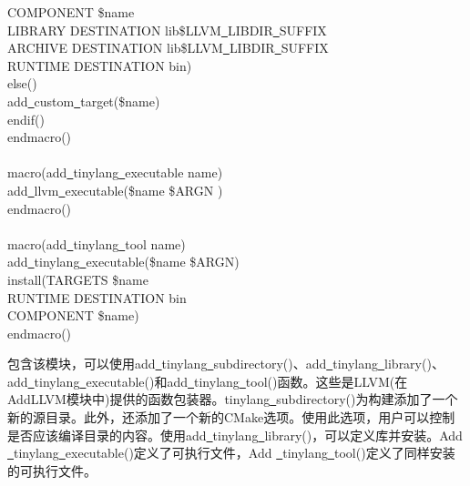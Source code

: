 \begin{tcolorbox}[colback=white,colframe=black]
\hspace*{1.5cm}COMPONENT \${name} \\
\hspace*{1.5cm}LIBRARY DESTINATION lib\${LLVM\underline{~}LIBDIR\underline{~}SUFFIX} \\
\hspace*{1.5cm}ARCHIVE DESTINATION lib\${LLVM\underline{~}LIBDIR\underline{~}SUFFIX} \\
\hspace*{1.5cm}RUNTIME DESTINATION bin) \\
\hspace*{0.5cm}else() \\
\hspace*{1cm}add\underline{~}custom\underline{~}target(\${name}) \\
\hspace*{0.5cm}endif() \\
endmacro() \\
 \\
macro(add\underline{~}tinylang\underline{~}executable name) \\
\hspace*{0.5cm}add\underline{~}llvm\underline{~}executable(\${name} \${ARGN} ) \\
endmacro() \\
 \\
macro(add\underline{~}tinylang\underline{~}tool name) \\
\hspace*{0.5cm}add\underline{~}tinylang\underline{~}executable(\${name} \${ARGN}) \\
\hspace*{0.5cm}install(TARGETS \${name} \\
\hspace*{1cm}RUNTIME DESTINATION bin \\
\hspace*{1cm}COMPONENT \${name}) \\
endmacro()
\end{tcolorbox}

包含该模块，可以使用add\underline{~}tinylang\underline{~}subdirectory()、add\underline{~}tinylang\underline{~}library()、add\underline{~}tinylang\underline{~}exe\allowbreak cutable()和add\underline{~}tinylang\underline{~}tool()函数。这些是LLVM(在AddLLVM模块中)提供的函数包装器。tinylang\underline{~}subdirectory()为构建添加了一个新的源目录。此外，还添加了一个新的CMake选项。使用此选项，用户可以控制是否应该编译目录的内容。使用add\underline{~}tinylang\underline{~}library()，可以定义库并安装。Add \underline{~}tinylang\underline{~}executable()定义了可执行文件，Add \underline{~}tinylang\underline{~}tool()定义了同样安装的可执行文件。\par

